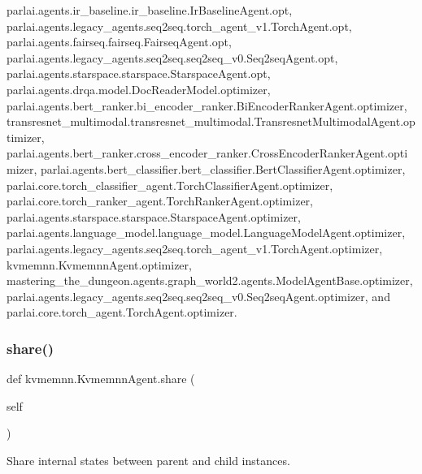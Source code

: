 parlai.\+agents.\+ir\+\_\+baseline.\+ir\+\_\+baseline.\+Ir\+Baseline\+Agent.\+opt, parlai.\+agents.\+legacy\+\_\+agents.\+seq2seq.\+torch\+\_\+agent\+\_\+v1.\+Torch\+Agent.\+opt, parlai.\+agents.\+fairseq.\+fairseq.\+Fairseq\+Agent.\+opt, parlai.\+agents.\+legacy\+\_\+agents.\+seq2seq.\+seq2seq\+\_\+v0.\+Seq2seq\+Agent.\+opt, parlai.\+agents.\+starspace.\+starspace.\+Starspace\+Agent.\+opt, parlai.\+agents.\+drqa.\+model.\+Doc\+Reader\+Model.\+optimizer, parlai.\+agents.\+bert\+\_\+ranker.\+bi\+\_\+encoder\+\_\+ranker.\+Bi\+Encoder\+Ranker\+Agent.\+optimizer, transresnet\+\_\+multimodal.\+transresnet\+\_\+multimodal.\+Transresnet\+Multimodal\+Agent.\+optimizer, parlai.\+agents.\+bert\+\_\+ranker.\+cross\+\_\+encoder\+\_\+ranker.\+Cross\+Encoder\+Ranker\+Agent.\+optimizer, parlai.\+agents.\+bert\+\_\+classifier.\+bert\+\_\+classifier.\+Bert\+Classifier\+Agent.\+optimizer, parlai.\+core.\+torch\+\_\+classifier\+\_\+agent.\+Torch\+Classifier\+Agent.\+optimizer, parlai.\+core.\+torch\+\_\+ranker\+\_\+agent.\+Torch\+Ranker\+Agent.\+optimizer, parlai.\+agents.\+starspace.\+starspace.\+Starspace\+Agent.\+optimizer, parlai.\+agents.\+language\+\_\+model.\+language\+\_\+model.\+Language\+Model\+Agent.\+optimizer, parlai.\+agents.\+legacy\+\_\+agents.\+seq2seq.\+torch\+\_\+agent\+\_\+v1.\+Torch\+Agent.\+optimizer, kvmemnn.\+Kvmemnn\+Agent.\+optimizer, mastering\+\_\+the\+\_\+dungeon.\+agents.\+graph\+\_\+world2.\+agents.\+Model\+Agent\+Base.\+optimizer, parlai.\+agents.\+legacy\+\_\+agents.\+seq2seq.\+seq2seq\+\_\+v0.\+Seq2seq\+Agent.\+optimizer, and parlai.\+core.\+torch\+\_\+agent.\+Torch\+Agent.\+optimizer.

\mbox{\label{classkvmemnn_1_1KvmemnnAgent_a2895b6a73d2c0661efce10ccc6bd9e85}} 
\subsubsection{\texorpdfstring{share()}{share()}}
{\footnotesize\ttfamily def kvmemnn.\+Kvmemnn\+Agent.\+share (\begin{DoxyParamCaption}\item[{}]{self }\end{DoxyParamCaption})}

\begin{DoxyVerb}Share internal states between parent and child instances.\end{DoxyVerb}
 

